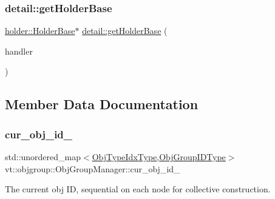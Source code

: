 \subsubsection{\texorpdfstring{detail\+::get\+Holder\+Base}{detail::getHolderBase}}
{\footnotesize\ttfamily \hyperlink{structvt_1_1objgroup_1_1holder_1_1_holder_base}{holder\+::\+Holder\+Base}$\ast$ \hyperlink{namespacevt_1_1objgroup_1_1detail_a8f4e9c94566b84be869adfeca53fc784}{detail\+::get\+Holder\+Base} (\begin{DoxyParamCaption}\item[{\hyperlink{namespacevt_af64846b57dfcaf104da3ef6967917573}{Handler\+Type}}]{handler }\end{DoxyParamCaption})\hspace{0.3cm}{\ttfamily [friend]}}



\subsection{Member Data Documentation}
\mbox{\label{structvt_1_1objgroup_1_1_obj_group_manager_a0e99df8712ce2d9e21404955ec312cf8}} 
\subsubsection{\texorpdfstring{cur\+\_\+obj\+\_\+id\+\_\+}{cur\_obj\_id\_}}
{\footnotesize\ttfamily std\+::unordered\+\_\+map$<$\hyperlink{namespacevt_1_1objgroup_a378e4b966221779c74f3a2f921eb2421}{Obj\+Type\+Idx\+Type},\hyperlink{namespacevt_1_1objgroup_a54a50ff6833bf618e5bedb9a3b6d0e07}{Obj\+Group\+I\+D\+Type}$>$ vt\+::objgroup\+::\+Obj\+Group\+Manager\+::cur\+\_\+obj\+\_\+id\+\_\+\hspace{0.3cm}{\ttfamily [private]}}



The current obj ID, sequential on each node for collective construction. 

\mbox{\label{structvt_1_1objgroup_1_1_obj_group_manager_aee25f043f12ed4447af6974acc5aa4cf}} 
